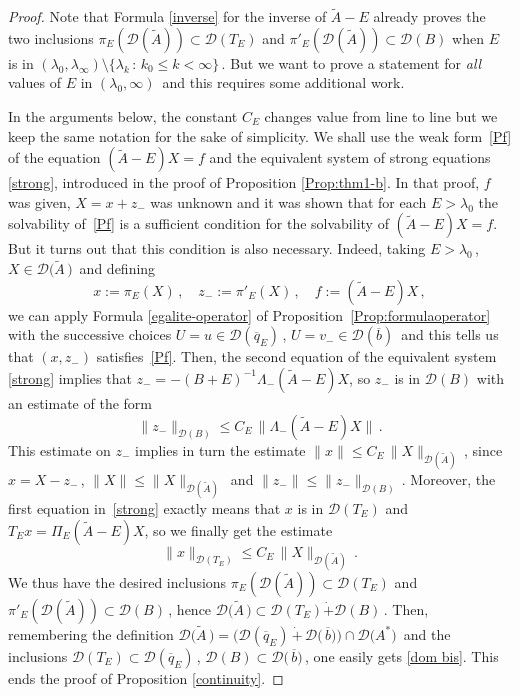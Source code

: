 \documentclass[12pt,reqno]{amsart}
\renewcommand{\(}{\left(}
\renewcommand{\)}{\right)}
\begin{document}
\begin{proof}
Note that Formula \eqref{inverse} for the inverse of $\widetilde A-E$ already proves the two inclusions $\pi_E\left(\mathcal D(\widetilde A)\right)\subset \mathcal D(T_E)$ and $\pi'_E\left(\mathcal D(\widetilde A)\right)\subset \mathcal D(B)$ when $E$ is in $(\lambda_0,\lambda_\infty)\setminus\{\lambda_k\,:\,k_0\leq k<\infty\}\,$. But we want to prove a statement for {\it all} values of $E$ in $(\lambda_0,\infty)\,$ and this requires some additional work.

In the arguments below, the constant $C_E$ changes value from line to line but we keep the same notation for the sake of simplicity. We shall use the weak form~\eqref{Pf} of the equation $(\widetilde A -E)X=f$ and the equivalent system of strong equations \eqref{strong}, introduced in the proof of Proposition \ref{Prop:thm1-b}. In that proof, $f$ was given, $X=x+z_-$ was unknown and it was shown that for each $E>\lambda_0$ the solvability of~\eqref{Pf} is a sufficient condition for the solvability of $(\widetilde A -E)X=f$. But it turns out that this condition is also necessary. Indeed, taking $E>\lambda_0\,$, $X\in \mathcal D\big(\widetilde A\,\big)\,$ and defining
\[x:=\pi_E(X)\,, \quad z_-:=\pi'_E(X)\,, \quad f:=(\widetilde A -E)X\,,\]
we can apply Formula \eqref{egalite-operator} of Proposition~\ref{Prop:formulaoperator} with the successive choices $U=u\in \mathcal D(\overline{q}_E)\,$, $U=v_-\in  \mathcal D(\overline{b})\,$ and this tells us that $(x,z_-)$ satisfies~\eqref{Pf}. Then, the second equation of the equivalent system \eqref{strong} implies that $z_-=-(B+E)^{-1}\Lambda_-(\widetilde A -E)X$, so $z_-$ is in $\mathcal D(B)$ with an estimate of the form
\[\| z_-\|_{\mathcal D(B)}\le C_E\,\| \Lambda_-(\widetilde A -E)X \| \,.\]
This estimate on $z_-$ implies in turn the estimate $\|x\| \le C_E\,\| X\|_{\mathcal D(\widetilde A)}\,$, since $x=X-z_-\,$, $\| X\|\leq \| X\|_{\mathcal D(\widetilde A)}\,$ and $\| z_-\|\leq\| z_-\|_{\mathcal D(B)}\,$.
Moreover, the first equation in~\eqref{strong} exactly means that $x$ is in $\mathcal D(T_E)$ and $T_E x=\Pi_E (\widetilde A -E)X$, so we finally get the estimate
\[\|x\|_{\mathcal D(T_E)} \le C_E\,\| X\|_{\mathcal D(\widetilde A)}\,.
\]
We thus have the desired inclusions $\pi_E\left(\mathcal D(\widetilde A)\right)\subset \mathcal D(T_E)$ and $\pi'_E\left(\mathcal D(\widetilde A)\right)\subset \mathcal D(B)\,$, hence
$\mathcal D\big(\widetilde A\,\big)\subset \mathcal D(T_E) \dot{+} \mathcal D(B)\,$. Then, remembering the definition $\mathcal D\big(\widetilde A\,\big)=\big(\mathcal D(\overline{q}_E)\,\dot{+}\,\mathcal D\big(\,\overline{b}\big)\big)\cap\mathcal D\big(A^*\big)\,$ and the inclusions $\mathcal D(T_E)\subset \mathcal D(\overline{q}_E)\,$, $\mathcal D(B)\subset \mathcal D\big(\,\overline{b}\big)\,$, one easily gets \eqref{dom bis}.
This ends the proof of Proposition \ref{continuity}.
\end{proof}
\end{document}
